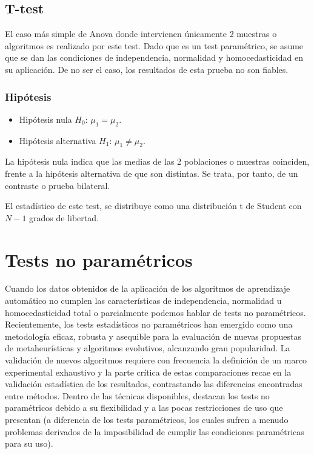 
\subsection{T-test}
El caso más simple de Anova donde intervienen únicamente 2 muestras o algoritmos es realizado por este test.
Dado que es un test paramétrico, se asume que se dan las condiciones de independencia, normalidad y homocedasticidad
en su aplicación. De no ser el caso, los resultados de esta prueba no son fiables.

\subsubsection{Hipótesis}
\begin{itemize}
\item Hipótesis nula $H_0$: $\mu_1 = \mu_2$.
\item Hipótesis alternativa $H_1$: $\mu_1 \neq \mu_2$.
\end{itemize}
La hipótesis nula indica que las medias de las 2 poblaciones o muestras coinciden, frente a la hipótesis alternativa
de que son distintas. Se trata, por tanto, de un contraste o prueba bilateral.

El estadístico de este test, se distribuye como una distribución t de Student con $N-1$ grados de libertad.



\section{Tests no paramétricos} \label{no_parametricos}
Cuando los datos obtenidos de la aplicación de los algoritmos de aprendizaje automático no cumplen las
características de independencia, normalidad u homocedasticidad total o parcialmente podemos hablar de tests
no paramétricos. Recientemente, los tests estadísticos no paramétricos han emergido como una metodología
eficaz, robusta y asequible para la evaluación de nuevas propuestas de metaheurísticas y algoritmos evolutivos,
alcanzando gran popularidad. La validación de nuevos algoritmos requiere con frecuencia la definición
de un marco experimental exhaustivo y la parte crítica de estas comparaciones recae en la validación
estadística de los resultados, contrastando las diferencias encontradas entre métodos. Dentro de las técnicas
disponibles, destacan los tests no paramétricos debido a su flexibilidad y a las pocas restricciones de
uso que presentan (a diferencia de los tests paramétricos, los cuales sufren a menudo problemas derivados
de la imposibilidad de cumplir las condiciones paramétricas para su uso). \cite{no_parametricos}


